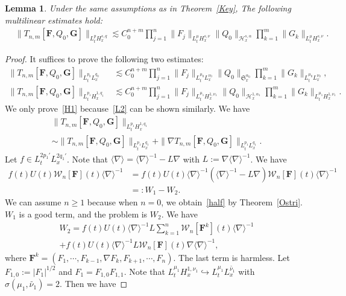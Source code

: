 \documentclass[10pt]{amsart}
\newtheorem{lemm}[theo]{Lemma}
\theoremstyle{definition}
\numberwithin{equation}{section}
\newcommand{\vF}{{\mathbf{F}}}
\newcommand{\vG}{{\mathbf{G}}}
\newcommand{\CH}{\mathcal{H}}
\newcommand{\CW}{\mathcal{W}}
\newcommand{\FS}{\mathfrak{S}}
\newcommand{\al}{\alpha}
\newcommand{\si}{\sigma}
\newcommand{\wt}{\widetilde}
\newcommand{\sd}{\langle \nabla \rangle}
\newcommand{\sdi}{\sd^{-1}}
\newcommand{\na}{\nabla}
\newcommand{\ls}{\lesssim}
\begin{document}
\begin{lemm}\label{muliti est}
Under the same assumptions as in Theorem~\ref{Key},
The following multilinear estimates hold:
\begin{align}
&\|T_{n,m} [\vF,Q_0,\vG]\|_{L^p_t H^{s,q}_x}
\ls C_0^{n+m}
\prod_{j=1}^n \|F_j\|_{L^{\mu}_t H^{s,\nu}_x}
\|Q_0\|_{\CH^{s,\al}_x}
\prod_{k=1}^m \|G_k\|_{L^{\mu}_t H^{s,\nu}_x}.
\end{align}
\end{lemm}

\begin{proof}
It suffices to prove the following two estimates:
\begin{align}
\|T_{n,m} [\vF,Q_0,\vG]\|_{L^{p_0}_t L^{q_0}_x}
&\ls C_0^{n+m}
\prod_{j=1}^n \|F_j\|_{L^{\mu_0}_t L^{\nu_0}_x}
\|Q_0\|_{\FS^{\al_0}_x}
\prod_{k=1}^m \|G_k\|_{L^{\mu_0}_t L^{\nu_0}_x} \label{L2}
,
\\
\|T_{n,m} [\vF,Q_0,\vG]\|_{L^{p_1}_t H^{1,q_1}_x}
&\ls C_0^{n+m}
\prod_{j=1}^n \|F_j\|_{L^{\mu_1}_t H^{1,\nu_1}_x}
\|Q_0\|_{\CH^{1, \al_1}_x}
\prod_{k=1}^m \|G_k\|_{L^{\mu_1}_t H^{1,\nu_1}_x}. \label{H1}
\end{align}
We only prove~\eqref{H1} because~\eqref{L2} can be shown similarly. We have
\begin{multline}
\|T_{n,m}[\vF,Q_0,\vG]\|_{L^{p_1}_t H^{1,q_1}_x} \\
\sim \|T_{n,m}[\vF,Q_0,\vG]\|_{L^{p_1}_t L^{q_1}_x} + \|\na T_{n,m}[\vF,Q_0,\vG]\|_{L^{p_1}_t L^{q_1}_x}.
\end{multline}
Let $f \in L^{2p_1'}_t L^{2q_1'}_x$. Note that $\sd = \sdi - L \na$ with $L:= \na \sdi$. We have
\begin{equation}
\begin{split}
f(t)U(t)\CW_n[\vF](t) \sd^{-1} &= f(t)U(t)\sdi \left(\sdi - L\na\right)\CW_n[\vF](t) \sd^{-1} \\
&=:W_1 - W_2.
\end{split}
\end{equation}
We can assume $n \ge 1$ because when $n=0$, we obtain~\eqref{half} by Theorem~\ref{Ostri}. $W_1$ is a good term, and the problem is $W_2$. We have
\begin{multline}
W_2 = f(t)U(t)\sdi L \sum_{k=1}^n \CW_n[\vF^k](t) \sd^{-1} \\+ f(t)U(t)\sdi L \CW_n[\vF](t) \na \sd^{-1},
\end{multline}
where $\vF^k = (F_1, \cdots, F_{k-1}, \na F_k, F_{k+1}, \cdots, F_n)$. The last term is harmless. Let $F_{1,0}:= |F_1|^{1/2}$ and $F_1 = F_{1,0}F_{1,1}$. Note that $L^{\mu_1}_t H^{1,\nu_1}_x \hookrightarrow L^{\mu_1}_t L^{\wt{\nu_1}}_x$ with $\si(\mu_1, \wt{\nu_1}) =2$. Then we have

\end{proof}
\end{document}
